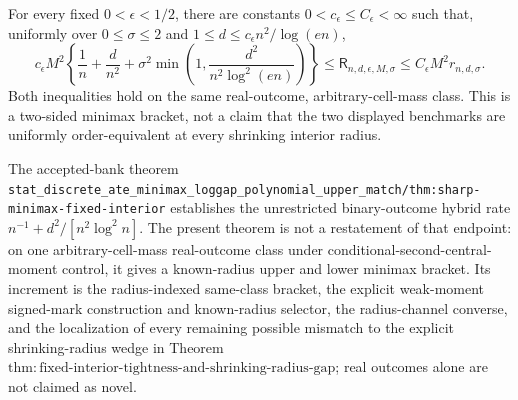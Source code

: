For every fixed \(0<\epsilon<1/2\), there are constants \(0<c_{\epsilon}\le C_{\epsilon}<\infty\) such that, uniformly over \(0\le\sigma\le2\) and \(1\le d\le c_{\epsilon}n^2/\log(en)\),
\[
 c_{\epsilon}M^2\left\{\frac1n+\frac d{n^2}+\sigma^2\min\left(1,\frac{d^2}{n^2\log^2(en)}\right)\right\}
 \le\mathsf R_{n,d,\epsilon,M,\sigma}
 \le C_{\epsilon}M^2r_{n,d,\sigma}.
\]
Both inequalities hold on the same real-outcome, arbitrary-cell-mass class.  This is a two-sided minimax bracket, not a claim that the two displayed benchmarks are uniformly order-equivalent at every shrinking interior radius.

The accepted-bank theorem \texttt{stat\_discrete\_ate\_minimax\_loggap\_polynomial\_upper\_match/thm:sharp-minimax-fixed-interior} establishes the unrestricted binary-outcome hybrid rate \(n^{-1}+d^2/[n^2\log^2 n]\).  The present theorem is not a restatement of that endpoint: on one arbitrary-cell-mass real-outcome class under conditional-second-central-moment control, it gives a known-radius upper and lower minimax bracket.  Its increment is the radius-indexed same-class bracket, the explicit weak-moment signed-mark construction and known-radius selector, the radius-channel converse, and the localization of every remaining possible mismatch to the explicit shrinking-radius wedge in Theorem~\(\mathrm{thm:fixed\text{-}interior\text{-}tightness\text{-}and\text{-}shrinking\text{-}radius\text{-}gap}\); real outcomes alone are not claimed as novel.